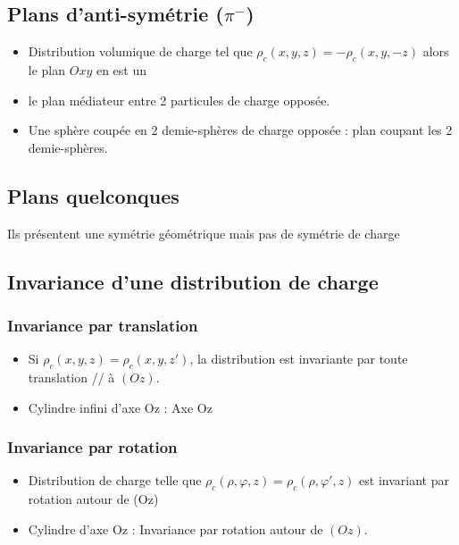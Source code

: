 \documentclass[french]{yLectureNote}
\begin{document}
\subsection{Plans d'anti-symétrie (\(\pi^-\))}
\begin{itemize}
 \item Distribution volumique de charge tel que \(\rho_c(x,y,z) = -\rho_c(x,y,-z)\) alors le plan \(Oxy\) en est un
 \item le plan médiateur entre 2 particules de charge opposée.
 \item Une sphère coupée en 2 demie-sphères de charge opposée : plan coupant les 2 demie-sphères.
\end{itemize}
\subsection{Plans quelconques}
Ils présentent une symétrie géométrique mais pas de symétrie de charge
\subsection{Invariance d'une distribution de charge}
\subsubsection{Invariance par translation}
\begin{itemize}
 \item Si \(\rho_c(x,y,z) = \rho_c(x,y,z')\), la distribution est invariante par toute translation // à \((Oz)\).
 \item Cylindre infini d'axe Oz : Axe Oz
\end{itemize}
\subsubsection{Invariance par rotation}
\begin{itemize}
 \item Distribution de charge telle que \(\rho_c(\rho, \varphi, z) = \rho_c(\rho, \varphi', z)\) est invariant par rotation autour  de (Oz)
 \item Cylindre d'axe Oz : Invariance par rotation autour de \((Oz)\).
\end{itemize}
 
\end{document}
